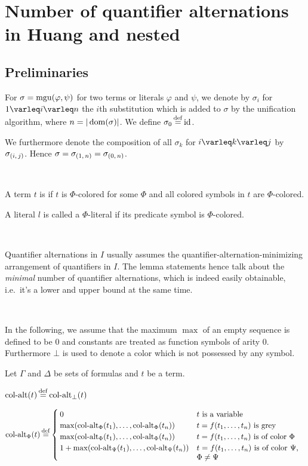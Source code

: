 \documentclass[,%
	draft=false,%
	numbers=noendperiod
	12pt,
	a4paper,
	oneside,%
	openany,
]{memoir}
\begin{document}
\chapter{ Number of quantifier alternations in Huang and nested }

\section{ Preliminaries }

For $\sigma = \operatorname{mgu}(\varphi, \psi)$ for two terms or literals $\varphi$ and $\psi$, we denote by $\sigma_i$ for $1\varleq i \varleq n$ the $i$th substitution which is added to $\sigma$ by the unification algorithm, where $n = |\operatorname{dom}(\sigma)|$.
We define $\sigma_0 \defeq \id$.

We furthermore denote the composition of all $\sigma_k$ for $i\varleq k \varleq j$ by $\sigma_{(i,\,j)}$.
Hence $\sigma = \sigma_{(1,\,n)} = \sigma_{(0,\,n)}$.

~

A term $t$ is  if $t$ is $\Phi$-colored for some $\Phi$ and all colored symbols in $t$ are $\Phi$-colored.

A literal $l$ is called a $\Phi$-literal if its predicate symbol is $\Phi$-colored.

~

Quantifier alternations in $I$ usually assumes the quantifier-alternation-minimizing arrangement of quantifiers in $I$. The lemma statements hence talk about the \emph{minimal} number of quantifier alternations, which is indeed easily obtainable, i.e.\ it's a lower and upper bound at the same time.

~

In the following, we assume that the maximum $\max$ of an empty sequence is defined to be $0$ and constants are treated as function symbols of arity $0$.
Furthermore $\bot$ is used to denote a color which is not possessed by any symbol.
\begin{defi}
	Let $\Gamma$ and $\Delta$ be sets of formulas and $t$ be a term.

	\medskip

	\noindent
	$\ca(t) \defeq \ca_\bot(t)$
	\medskip

	\noindent
	$
	\ca_\Phi(t) \defeq 
	\begin{cases}
		0 & \text{$t$ is a variable} \\
		\max(\ca_\Phi(t_1), \dots, \ca_\Phi(t_n)) & \text{$t = f(t_1, \dots, t_n)$ is grey} \\
		\max(\ca_\Phi(t_1), \dots, \ca_\Phi(t_n)) & \parbox[t]{0.4\textwidth}{$t = f(t_1, \dots, t_n)$ is of color $\Phi$} \\
		1 + \max(\ca_\Psi(t_1), \dots, \ca_\Psi(t_n)) & \parbox[t]{0.38\textwidth}{$t = f(t_1, \dots, t_n)$ is of color $\Psi$, $\Phi \neq \Psi$} \\
	\end{cases}
	$
\end{defi}
\end{document}

